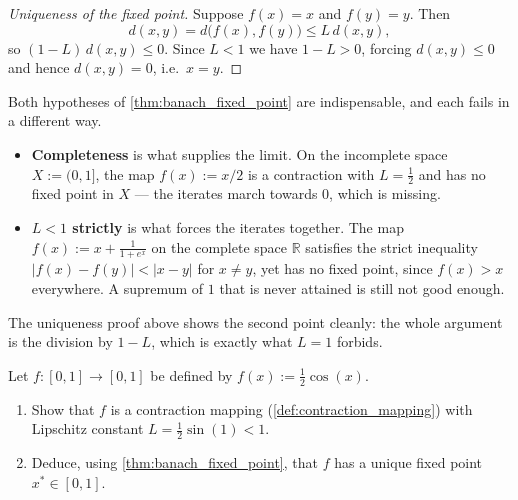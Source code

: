 \begin{proof}[Uniqueness of the fixed point]
Suppose $f(x) = x$ and $f(y) = y$. Then
\[d(x,y) = d\big(f(x),f(y)\big) \leq L\,d(x,y),\]
so $(1-L)\,d(x,y) \leq 0$. Since $L<1$ we have $1-L>0$, forcing $d(x,y) \leq 0$ and hence
$d(x,y)=0$, i.e.\ $x=y$.
\end{proof}

\begin{remark}
\label{rem:banach_hypotheses}
Both hypotheses of \cref{thm:banach_fixed_point} are indispensable, and each fails in a
different way.
\begin{itemize}
  \item \textbf{Completeness} is what supplies the limit. On the incomplete space
    $X := (0,1]$, the map $f(x) := x/2$ is a contraction with $L=\tfrac12$ and has no fixed
    point in $X$ --- the iterates march towards $0$, which is missing.
  \item \textbf{$L<1$ strictly} is what forces the iterates together. The map
    $f(x) := x + \tfrac{1}{1+e^{x}}$ on the complete space $\mathbb{R}$ satisfies the strict
    inequality $|f(x)-f(y)| < |x-y|$ for $x \neq y$, yet has no fixed point, since
    $f(x)>x$ everywhere. A supremum of $1$ that is never attained is still not good enough.
\end{itemize}
The uniqueness proof above shows the second point cleanly: the whole argument is the division by
$1-L$, which is exactly what $L=1$ forbids.
\end{remark}

\begin{aiexercise}
\label{ex:ai_contraction_cos}
Let $f \colon [0,1] \to [0,1]$ be defined by $f(x) := \frac{1}{2}\cos(x)$.
\begin{enumerate}[label=\textbf{(\alph*)}]
  \item Show that $f$ is a contraction mapping (\cref{def:contraction_mapping}) with Lipschitz
    constant $L = \frac{1}{2}\sin(1) < 1$.
  \item Deduce, using \cref{thm:banach_fixed_point}, that $f$ has a unique fixed point
    $x^* \in [0,1]$.
\end{enumerate}
\end{aiexercise}




